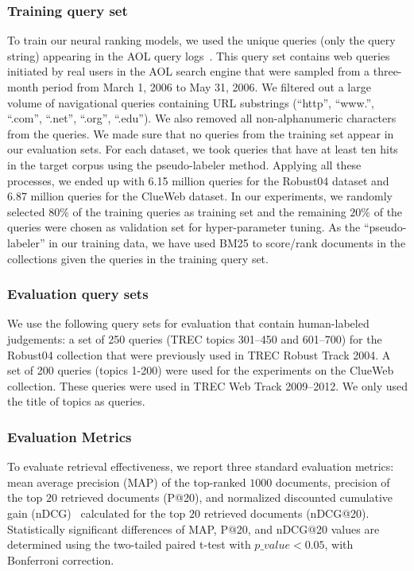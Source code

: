 \subsubsection{Training query set}
\label{sec:query_set}
To train our neural ranking models, we used the unique queries (only the query string) appearing in the AOL query logs~\citep{Pass:2006}. This query set contains web queries initiated by real users in the AOL search engine that were sampled from a three-month period from March 1, 2006 to May 31, 2006. We filtered out a large volume of navigational queries containing URL substrings (``http'', ``www.'', ``.com'', ``.net'', ``.org'', ``.edu''). We also removed all non-alphanumeric characters from the queries. We made sure that no queries from the training set appear in our evaluation sets. For each dataset, we took queries that have at least ten hits in the target corpus using the pseudo-labeler method. Applying all these processes, we ended up with 6.15 million queries for the Robust04 dataset and 6.87 million queries for the ClueWeb dataset. 
In our experiments, we randomly selected $80\%$ of the training queries as training set and the remaining $20\%$ of the queries were chosen as validation set for hyper-parameter tuning. As the ``pseudo-labeler'' in our training data, we have used BM25 to score/rank documents in the collections given the queries in the training query set.

\subsubsection{Evaluation query sets} 
We use the following query sets for evaluation that contain human-labeled judgements: a set of 250 queries (TREC topics 301--450 and 601--700) for the Robust04 collection that were previously used in TREC Robust Track 2004. A set of 200 queries (topics 1-200) were used for the experiments on the ClueWeb collection. These queries were used in TREC Web Track 2009--2012. We only used the title of topics as queries.

\subsubsection{Evaluation Metrics}
To evaluate retrieval effectiveness, we report three standard evaluation metrics: mean average precision (MAP) of the top-ranked $1000$ documents, precision of the top $20$ retrieved documents (P@20), and normalized discounted cumulative gain (nDCG)~\citep{Jarvelin:2002} calculated for the top $20$ retrieved documents (nDCG@20). Statistically significant differences of MAP, P@20, and nDCG@20 values are determined using the two-tailed paired t-test with $p\_value<0.05$, with Bonferroni correction.


